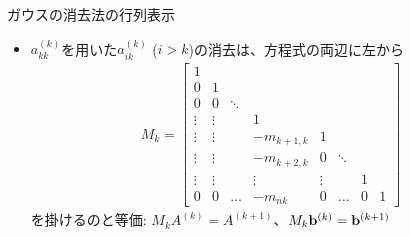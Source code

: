 \begin{frame}[t,fragile]{ガウスの消去法の行列表示}
  \begin{itemize}
  \item $a_{kk}^{(k)}$を用いた$a_{ik}^{(k)}$ ($i>k$)の消去は、方程式の両辺に左から
    \begin{align*}
      M_k = 
      \begin{bmatrix}
        1 & \\
        0 & 1 \\
        0 & 0 & \ddots \\
        \vdots & \vdots & & 1 \\
        \vdots & \vdots & & -m_{k+1,k} & 1 & \\
        \vdots & \vdots & & -m_{k+2,k} & 0 & \ddots \\
        \vdots & \vdots & & \vdots & \vdots & & 1 & \\
        0 & 0 & \hdots & -m_{nk} & 0 & \hdots & 0 & 1
      \end{bmatrix}
    \end{align*}
    を掛けるのと等価: $M_k A^{(k)} = A^{(k+1)}$、$M_k {\bf b}^{(k)} = {\bf b}^{(k+1)}$
  \end{itemize}
\end{frame}
